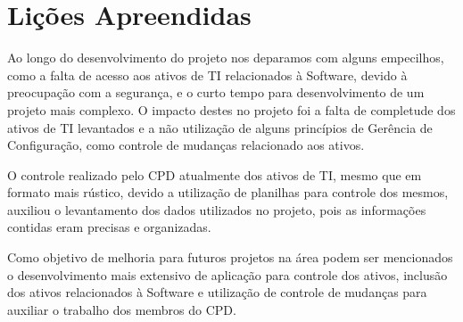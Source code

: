 \chapter{Lições Apreendidas}
Ao longo do desenvolvimento do projeto nos deparamos com alguns empecilhos, como a falta de acesso aos ativos de TI relacionados à Software, devido à preocupação com a segurança, e o curto tempo para desenvolvimento de um projeto mais complexo. O impacto destes no projeto foi a falta de completude dos ativos de TI levantados e a não utilização de alguns princípios de Gerência de Configuração, como controle de mudanças relacionado aos ativos.

O controle realizado pelo CPD atualmente dos ativos de TI, mesmo que em formato mais rústico, devido a utilização de planilhas para controle dos mesmos, auxiliou o levantamento dos dados utilizados no projeto, pois as informações contidas eram precisas e organizadas.

Como objetivo de melhoria para futuros projetos na área podem ser mencionados o desenvolvimento mais extensivo de aplicação para controle dos ativos, inclusão dos ativos relacionados à Software e utilização de controle de mudanças para auxiliar o trabalho dos membros do CPD.
